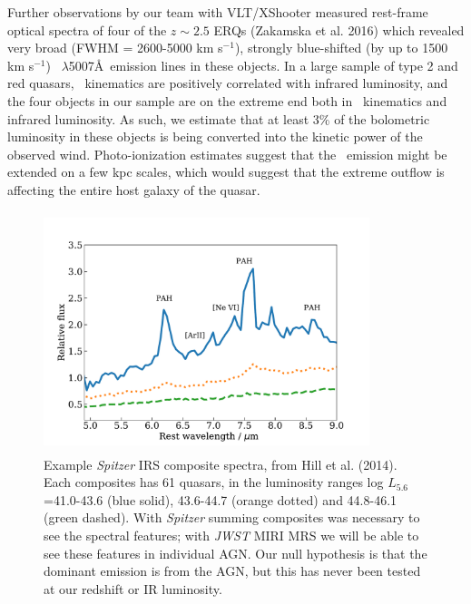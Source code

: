 \vspace{-22pt}

\smallskip
\smallskip
\noindent
Further observations by our team with VLT/XShooter measured rest-frame
optical spectra of four of the $z\sim 2.5$ ERQs (Zakamska et al. 2016)
which revealed very broad (FWHM = 2600-5000 km s$^{-1}$), strongly
blue-shifted (by up to 1500 km s$^{-1}$) \oiii\ $\lambda$5007\AA\
emission lines in these objects. In a large sample of type 2 and red
quasars, \oiii\ kinematics are positively correlated with infrared
luminosity, and the four objects in our sample are on the extreme end
both in \oiii\ kinematics and infrared luminosity.  As such, we
estimate that at least 3\% of the bolometric luminosity in these
objects is being converted into the kinetic power of the observed
wind. Photo-ionization estimates suggest that the \oiii\ emission
might be extended on a few kpc scales, which would suggest that the
extreme outflow is affecting the entire host galaxy of the quasar.


\begin{figure}
  \centering
  \includegraphics[height=7.0cm,width=9.5cm, trim={32pt 6pt 42pt 12pt},clip]{../Figures/Hill2014_IRspectra_Lrange_v2}
  \caption{\footnotesize    
    Example {\it Spitzer} IRS composite spectra, from Hill et al. (2014). 
    Each composites has 61 quasars, in the luminosity
    ranges log $L_{5.6}$ =41.0-43.6 (blue solid), 43.6-44.7 (orange dotted) 
    and 44.8-46.1 (green dashed). 
    With
    {\it Spitzer} summing composites was necessary to see the spectral
    features; with {\it JWST} MIRI MRS we will be able to see these features
    in individual AGN. Our null hypothesis is that the dominant emission
    is from the AGN, but this has never been tested at our redshift or IR
    luminosity.}
  \label{fig:eg_spectra}
\end{figure}
\normalsize

